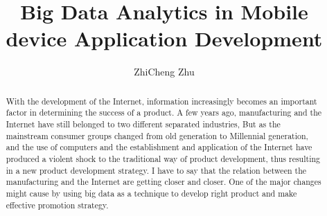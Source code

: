 \documentclass[sigconf]{acmart}
\begin{document}
\title{Big Data Analytics in Mobile device Application Development}


\author{ZhiCheng Zhu}


\begin{abstract}

    With the development of the Internet, information increasingly becomes an important factor in determining the success of a product. A few years ago, manufacturing and the Internet have still belonged to two different separated industries, But as the mainstream consumer groups changed from old generation to Millennial generation, and the use of computers and the establishment and application of the Internet have produced a violent shock to the traditional way of product development, thus resulting in a new product development strategy. I have to say that the relation between the manufacturing and the Internet are getting closer and closer. One of the major changes might cause by using big data as a technique to develop right product and make effective promotion strategy.
    
\end{abstract}


\maketitle
\end{document}
